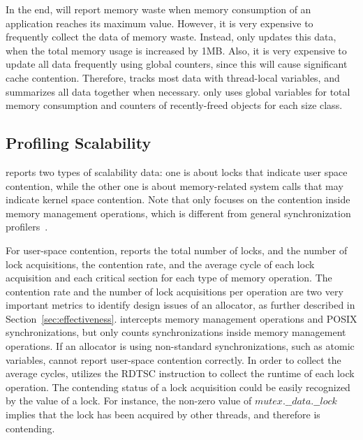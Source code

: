 In the end, \MP{} will report memory waste when memory consumption of an application reaches its maximum value. However, it is very expensive to frequently collect the data of memory waste. Instead, \MP{} only updates this data, when the total memory usage is increased by 1MB. Also, it is very expensive to update all data frequently using global counters, since this will cause significant cache contention. Therefore, \MP{} tracks most data with thread-local variables, and summarizes all data together when necessary. \MP{} only uses global variables for total memory consumption and counters of recently-freed objects for each size class.

\subsection{Profiling Scalability}
\label{sec:profilingscale}

\MP{} reports two types of scalability data: one is about locks that indicate user space contention, while the other one is about memory-related system calls that may indicate kernel space contention. Note that \MP{} only focuses on the contention inside memory management operations, which is different from general synchronization profilers~\cite{SyncProf, SyncPerf, wPerf}.

For user-space contention, \MP{} reports the total number of locks, and the number of lock acquisitions, the contention rate, and the average cycle of each lock acquisition and each critical section for each type of memory operation. The contention rate and the number of lock acquisitions per operation are two very important metrics to identify design issues of an allocator, as further described in Section~\ref{sec:effectiveness}.  \MP{} intercepts memory management operations and POSIX synchronizations, but only counts synchronizations inside memory management operations. If an allocator is using non-standard synchronizations, such as atomic variables, \MP{} cannot report user-space contention correctly. In order to collect the average cycles, \MP{} utilizes the RDTSC instruction to collect the runtime of each lock operation. The contending status of a lock acquisition could be easily recognized by the value of a lock. For instance, the non-zero value of $mutex.\_\_data.\_\_lock$ implies that the lock has been acquired by other threads, and therefore is contending. 

